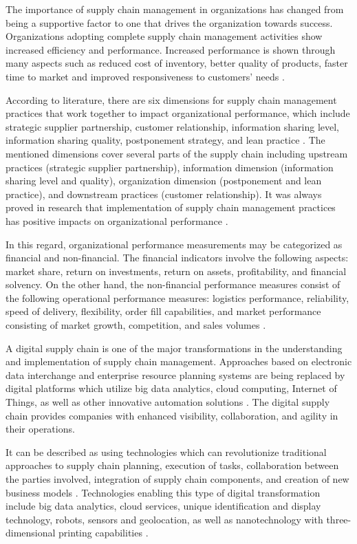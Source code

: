 \documentclass[11pt]{article}
\begin{document}
The importance of supply chain management in organizations has changed from being a supportive factor to one that drives the organization towards success. Organizations adopting complete supply chain management activities show increased efficiency and performance. Increased performance is shown through many aspects such as reduced cost of inventory, better quality of products, faster time to market and improved responsiveness to customers' needs \cite{ref21,ref22}.

According to literature, there are six dimensions for supply chain management practices that work together to impact organizational performance, which include strategic supplier partnership, customer relationship, information sharing level, information sharing quality, postponement strategy, and lean practice \cite{ref22}. The mentioned dimensions cover several parts of the supply chain including upstream practices (strategic supplier partnership), information dimension (information sharing level and quality), organization dimension (postponement and lean practice), and downstream practices (customer relationship). It was always proved in research that implementation of supply chain management practices has positive impacts on organizational performance \cite{ref22}.

In this regard, organizational performance measurements may be categorized as financial and non-financial. The financial indicators involve the following aspects: market share, return on investments, return on assets, profitability, and financial solvency. On the other hand, the non-financial performance measures consist of the following operational performance measures: logistics performance, reliability, speed of delivery, flexibility, order fill capabilities, and market performance consisting of market growth, competition, and sales volumes \cite{ref22}.

A digital supply chain is one of the major transformations in the understanding and implementation of supply chain management. Approaches based on electronic data interchange and enterprise resource planning systems are being replaced by digital platforms which utilize big data analytics, cloud computing, Internet of Things, as well as other innovative automation solutions \cite{ref21}. The digital supply chain provides companies with enhanced visibility, collaboration, and agility in their operations.

It can be described as using technologies which can revolutionize traditional approaches to supply chain planning, execution of tasks, collaboration between the parties involved, integration of supply chain components, and creation of new business models \cite{ref21}. Technologies enabling this type of digital transformation include big data analytics, cloud services, unique identification and display technology, robots, sensors and geolocation, as well as nanotechnology with three-dimensional printing capabilities \cite{ref21}.
\end{document}
